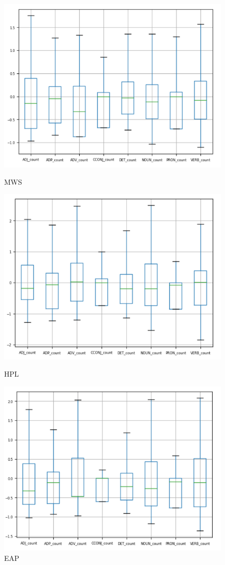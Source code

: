 \documentclass[12pt]{article}
\begin{document}
\begin{figure}[h]
  \begin{multicols}{3}
      \includegraphics[width=\linewidth]{images/tag_mws.png}\par\caption{MWS}
      \includegraphics[width=\linewidth]{images/tag_hpl.png}\par\caption{HPL}
      \includegraphics[width=\linewidth]{images/tag_eap.png}\par\caption{EAP}

\end{multicols}
\end{figure}
\end{document}
